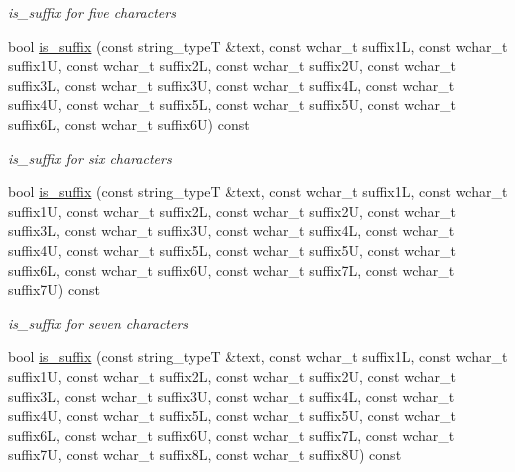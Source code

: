 \begin{DoxyCompactItemize}
\begin{DoxyCompactList}\small\item\em is\+\_\+suffix for five characters \end{DoxyCompactList}\item 
\hypertarget{classstemming_1_1stem_abe83f7592028b43f5cec9ce35ae1d9df}{bool \hyperlink{classstemming_1_1stem_abe83f7592028b43f5cec9ce35ae1d9df}{is\+\_\+suffix} (const string\+\_\+type\+T \&text, const wchar\+\_\+t suffix1\+L, const wchar\+\_\+t suffix1\+U, const wchar\+\_\+t suffix2\+L, const wchar\+\_\+t suffix2\+U, const wchar\+\_\+t suffix3\+L, const wchar\+\_\+t suffix3\+U, const wchar\+\_\+t suffix4\+L, const wchar\+\_\+t suffix4\+U, const wchar\+\_\+t suffix5\+L, const wchar\+\_\+t suffix5\+U, const wchar\+\_\+t suffix6\+L, const wchar\+\_\+t suffix6\+U) const }\label{classstemming_1_1stem_abe83f7592028b43f5cec9ce35ae1d9df}

\begin{DoxyCompactList}\small\item\em is\+\_\+suffix for six characters \end{DoxyCompactList}\item 
\hypertarget{classstemming_1_1stem_a79f18e256337d37054c80de470660a65}{bool \hyperlink{classstemming_1_1stem_a79f18e256337d37054c80de470660a65}{is\+\_\+suffix} (const string\+\_\+type\+T \&text, const wchar\+\_\+t suffix1\+L, const wchar\+\_\+t suffix1\+U, const wchar\+\_\+t suffix2\+L, const wchar\+\_\+t suffix2\+U, const wchar\+\_\+t suffix3\+L, const wchar\+\_\+t suffix3\+U, const wchar\+\_\+t suffix4\+L, const wchar\+\_\+t suffix4\+U, const wchar\+\_\+t suffix5\+L, const wchar\+\_\+t suffix5\+U, const wchar\+\_\+t suffix6\+L, const wchar\+\_\+t suffix6\+U, const wchar\+\_\+t suffix7\+L, const wchar\+\_\+t suffix7\+U) const }\label{classstemming_1_1stem_a79f18e256337d37054c80de470660a65}

\begin{DoxyCompactList}\small\item\em is\+\_\+suffix for seven characters \end{DoxyCompactList}\item 
\hypertarget{classstemming_1_1stem_aa18daf5b33d220d93dff22d6e591edd6}{bool \hyperlink{classstemming_1_1stem_aa18daf5b33d220d93dff22d6e591edd6}{is\+\_\+suffix} (const string\+\_\+type\+T \&text, const wchar\+\_\+t suffix1\+L, const wchar\+\_\+t suffix1\+U, const wchar\+\_\+t suffix2\+L, const wchar\+\_\+t suffix2\+U, const wchar\+\_\+t suffix3\+L, const wchar\+\_\+t suffix3\+U, const wchar\+\_\+t suffix4\+L, const wchar\+\_\+t suffix4\+U, const wchar\+\_\+t suffix5\+L, const wchar\+\_\+t suffix5\+U, const wchar\+\_\+t suffix6\+L, const wchar\+\_\+t suffix6\+U, const wchar\+\_\+t suffix7\+L, const wchar\+\_\+t suffix7\+U, const wchar\+\_\+t suffix8\+L, const wchar\+\_\+t suffix8\+U) const }\label{classstemming_1_1stem_aa18daf5b33d220d93dff22d6e591edd6}


\end{DoxyCompactItemize}
